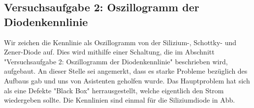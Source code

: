 \documentclass[a4paper,10pt]{article}
\numberwithin{equation}{section}
\begin{document}
\subsection{Versuchsaufgabe 2: Oszillogramm der Diodenkennlinie}
Wir zeichen die Kennlinie als Oszillogramm von der Silizium-, Schottky- und Zener-Diode auf. Dies wird mithilfe einer Schaltung, die im Abschnitt "Versuchsaufgabe 2: Oszillogramm der Diodenkennlinie" \cite{Praktikumsanleitung} beschrieben wird, aufgebaut. An dieser Stelle sei angemerkt, dass es starke Probleme bezüglich des Aufbaus gab und uns von Asistenten geholfen wurde. Das Hauptproblem hat sich als eine Defekte "Black Box" \cite{Praktikumsanleitung} herrausgestellt, welche eigentlich den Strom wiedergeben sollte. Die Kennlinien sind einmal für die Siliziumdiode in Abb. 

\newpage
\listoffigures
\listoftables



\end{document}
